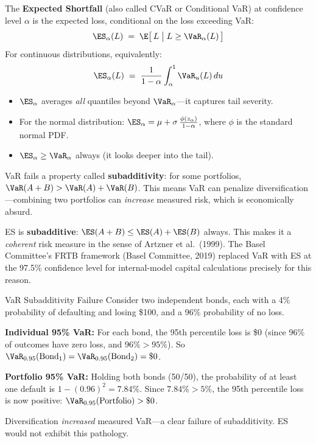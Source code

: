 \begin{definition}
The \textbf{Expected Shortfall} (also called CVaR or Conditional VaR) at
confidence level $\alpha$ is the expected loss, conditional on the loss
exceeding VaR:
\begin{equation}
\label{eq:es-def}
\ES_\alpha(L) \;=\; \E\bigl[\,L \;\big|\; L \ge \VaR_\alpha(L)\,\bigr]
\end{equation}
For continuous distributions, equivalently:
\begin{equation}
\label{eq:es-integral}
\ES_\alpha(L) \;=\; \frac{1}{1-\alpha}\int_\alpha^1 \VaR_u(L)\,du
\end{equation}
\begin{itemize}[nosep]
  \item $\ES_\alpha$ averages \emph{all} quantiles beyond
        $\VaR_\alpha$---it captures tail severity.
  \item For the normal distribution:
        $\ES_\alpha = \mu + \sigma\,\frac{\phi(z_\alpha)}{1-\alpha}$,
        where $\phi$ is the standard normal PDF.
  \item $\ES_\alpha \ge \VaR_\alpha$ always (it looks deeper into the
        tail).
\end{itemize}
\end{definition}

\begin{keyidea}
VaR fails a property called \textbf{subadditivity}: for some portfolios,
$\VaR(A+B) > \VaR(A) + \VaR(B)$.  This means VaR can penalize
diversification---combining two portfolios can \emph{increase} measured
risk, which is economically absurd.

ES is \textbf{subadditive}: $\ES(A+B) \le \ES(A) + \ES(B)$ always.
This makes it a \emph{coherent} risk measure in the sense of
Artzner et al.\ (1999).  The Basel Committee's FRTB framework
(Basel Committee, 2019) replaced VaR with ES at the 97.5\% confidence
level for internal-model capital calculations precisely for this reason.
\end{keyidea}

\begin{workedexample}{VaR Subadditivity Failure}
Consider two independent bonds, each with a 4\% probability of defaulting
and losing \$100, and a 96\% probability of no loss.

\textbf{Individual 95\% VaR:} For each bond, the 95th percentile loss is
\$0 (since 96\% of outcomes have zero loss, and $96\% > 95\%$).
So $\VaR_{0.95}(\text{Bond}_1) = \VaR_{0.95}(\text{Bond}_2) = \$0$.

\textbf{Portfolio 95\% VaR:} Holding both bonds (50/50), the probability of
at least one default is $1-(0.96)^2 = 7.84\%$.  Since $7.84\% > 5\%$, the
95th percentile loss is now positive: $\VaR_{0.95}(\text{Portfolio}) > \$0$.

Diversification \emph{increased} measured VaR---a clear failure of
subadditivity.  ES would not exhibit this pathology.
\end{workedexample}

